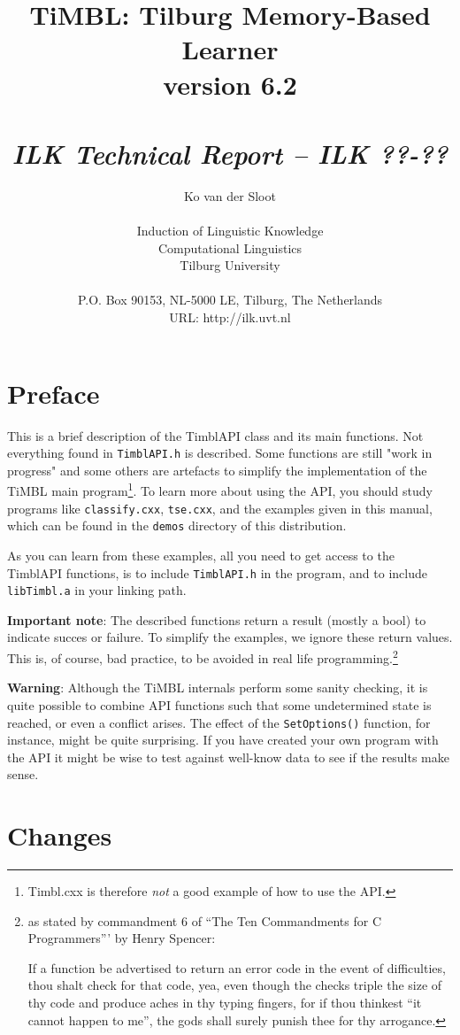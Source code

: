 \documentclass{report}
\author{Ko van der Sloot\\ \ \\ Induction of Linguistic Knowledge\\
        Computational Linguistics\\ Tilburg University \\ \ \\
        P.O. Box 90153, NL-5000 LE, Tilburg, The Netherlands \\ URL:
        http://ilk.uvt.nl}
\title{{\huge TiMBL: Tilburg Memory-Based Learner} \\ \vspace*{0.5cm}
{\bf version 6.2} \\ \vspace*{0.5cm}{\huge API Reference Guide}\\
\vspace*{1cm} {\it ILK Technical Report -- ILK ??-??}}
\begin{document}
\maketitle

\tableofcontents

\chapter*{Preface}

This is a brief description of the TimblAPI class and its main
functions.  Not everything found in {\tt TimblAPI.h} is
described. Some functions are still "work in progress" and some others
are artefacts to simplify the implementation of the TiMBL main
program\footnote{Timbl.cxx is therefore {\em not} a good example of
  how to use the API.}.  To learn more about using the API, you should
study programs like {\tt classify.cxx}, {\tt tse.cxx}, and the
examples given in this manual, which can be found in the {\tt demos}
directory of this distribution.

As you can learn from these examples, all you need to get access to the
TimblAPI functions, is to include {\tt TimblAPI.h} in the program, and to
include {\tt libTimbl.a} in your linking path. 

{\bf Important note}: The described functions return a result (mostly
a bool) to indicate succes or failure. To simplify the examples, we
ignore these return values. This is, of course, bad practice, to be avoided in
real life programming.\footnote{as stated by commandment 6 of ``The
  Ten Commandments for C Programmers''' by Henry Spencer:	

If a function be advertised to return an error code in the event of
difficulties, thou shalt check for that code, yea, even though the
checks triple the size of thy code and produce aches in thy typing
fingers, for if thou thinkest ``it cannot happen to me'', the gods
shall surely punish thee for thy arrogance.}

{\bf Warning}: Although the TiMBL internals perform some sanity
checking, it is quite possible to combine API functions such
that some undetermined state is reached, or even a conflict
arises. The effect of the {\tt SetOptions()} function, for instance,
might be quite surprising. If you have created your own program
with the API it might be wise to test against well-know data to see if
the results make sense.

\chapter{Changes}
\label{changes}
\end{document}
